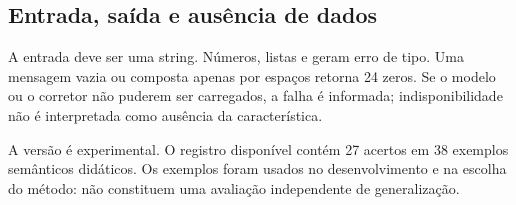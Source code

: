 \subsection{Entrada, saída e ausência de dados}
A entrada deve ser uma string. Números, listas e  geram erro de tipo. Uma mensagem vazia ou composta apenas por espaços retorna 24 zeros. Se o modelo ou o corretor não puderem ser carregados, a falha é informada; indisponibilidade não é interpretada como ausência da característica.

\begin{caixaatencao}
A versão  é experimental. O registro disponível contém 27 acertos em 38 exemplos semânticos didáticos. Os exemplos foram usados no desenvolvimento e na escolha do método: não constituem uma avaliação independente de generalização.
\end{caixaatencao}
